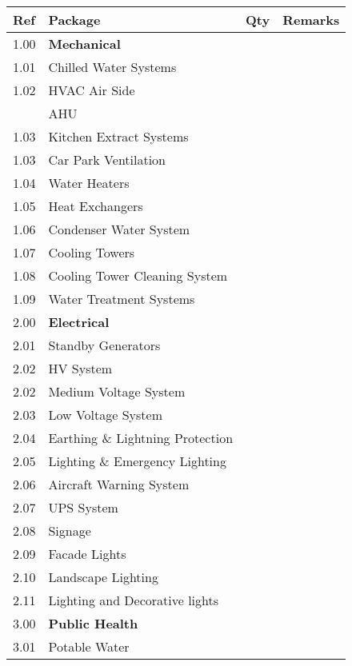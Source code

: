 \label{masterplan}
{\RaggedRight\small
\begin{longtable}[l]{l >{\RaggedRight}p{5.5cm}lp{5cm}@{}}
\toprule

Ref		&Package	&Qty	&Remarks   \\
\midrule
1.00	&\textbf{Mechanical}	&	&\\
1.01	&Chilled Water Systems	&	&\\
1.02	&HVAC Air Side   & 		&   \\
        & \hfill AHU     &      &   \\
1.03    &Kitchen Extract Systems & & \\
1.03	&Car Park Ventilation 	&& \\
1.04	&Water Heaters && \\

1.05    &Heat Exchangers       &&\\

1.06	&Condenser Water System 	&&\\

1.07  	&Cooling Towers               &&\\
1.08 	&Cooling Tower Cleaning System &&\\
1.09 	&Water Treatment Systems &&\\ 

\midrule

2.00	&\textbf{Electrical}		&&\\
2.01	&Standby Generators	& &   \\
2.02 	& HV System              & &\\
2.02	&Medium Voltage System	& &\\	

2.03	&Low Voltage System		& &\\

2.04	&Earthing \& Lightning Protection & &  \\		

2.05	&Lighting \& Emergency Lighting  & & \\		

2.06	&Aircraft Warning System & &  \\	
	
2.07	&UPS System	& &  \\	
2.08  	&Signage          &&\\
2.09  	&Facade Lights  &&\\
2.10 	&Landscape Lighting &&\\
2.11  	&Lighting and Decorative lights &&\\
\midrule
3.00	&\textbf{Public Health}		&&\\
3.01	&Potable Water	& & \\	


\end{longtable}}
